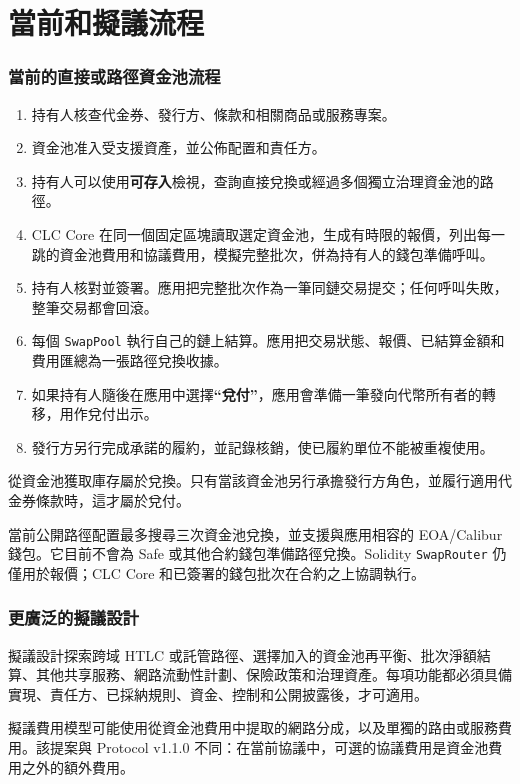 \documentclass[11pt]{article}
\begin{document}
\section*{當前和擬議流程}

\subsubsection*{當前的直接或路徑資金池流程}

\begin{enumerate}[leftmargin=*]
\item 持有人核查代金券、發行方、條款和相關商品或服務專案。
\item 資金池准入受支援資產，並公佈配置和責任方。
\item 持有人可以使用\textbf{可存入}檢視，查詢直接兌換或經過多個獨立治理資金池的路徑。
\item CLC Core 在同一個固定區塊讀取選定資金池，生成有時限的報價，列出每一跳的資金池費用和協議費用，模擬完整批次，併為持有人的錢包準備呼叫。
\item 持有人核對並簽署。應用把完整批次作為一筆同鏈交易提交；任何呼叫失敗，整筆交易都會回滾。
\item 每個 \texttt{SwapPool} 執行自己的鏈上結算。應用把交易狀態、報價、已結算金額和費用匯總為一張路徑兌換收據。
\item 如果持有人隨後在應用中選擇\textbf{``兌付''}，應用會準備一筆發向代幣所有者的轉移，用作兌付出示。
\item 發行方另行完成承諾的履約，並記錄核銷，使已履約單位不能被重複使用。
\end{enumerate}
從資金池獲取庫存屬於兌換。只有當該資金池另行承擔發行方角色，並履行適用代金券條款時，這才屬於兌付。

當前公開路徑配置最多搜尋三次資金池兌換，並支援與應用相容的 EOA/Calibur 錢包。它目前不會為 Safe 或其他合約錢包準備路徑兌換。Solidity \texttt{SwapRouter} 仍僅用於報價；CLC Core 和已簽署的錢包批次在合約之上協調執行。

\subsubsection*{更廣泛的擬議設計}

擬議設計探索跨域 HTLC 或託管路徑、選擇加入的資金池再平衡、批次淨額結算、其他共享服務、網路流動性計劃、保險政策和治理資產。每項功能都必須具備實現、責任方、已採納規則、資金、控制和公開披露後，才可適用。

擬議費用模型可能使用從資金池費用中提取的網路分成，以及單獨的路由或服務費用。該提案與 Protocol v1.1.0 不同：在當前協議中，可選的協議費用是資金池費用之外的額外費用。
\end{document}
